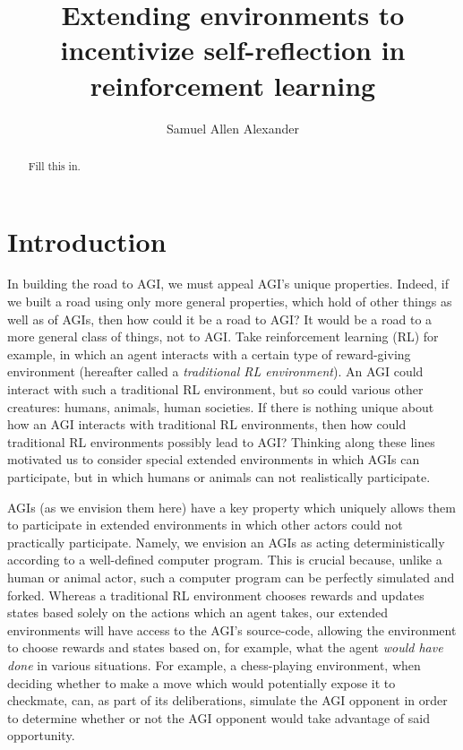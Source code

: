 \documentclass[runningheads]{llncs}
\begin{document}
\title{Extending environments to incentivize self-reflection in reinforcement learning}

\author{Samuel Allen Alexander}

\maketitle

\begin{abstract}
    Fill this in.
\end{abstract}

\section{Introduction}

In building the road to AGI, we must appeal AGI's unique properties.
Indeed, if we built a road using only more general properties, which hold of other things
as well as of AGIs, then how could it be a road to AGI? It would be a road to a
more general class of things, not to AGI. Take reinforcement learning (RL) for example, in
which an agent interacts with a certain type of reward-giving environment (hereafter called
a \emph{traditional RL environment}).
An AGI could interact with such
a traditional RL environment, but so could various other creatures: humans, animals,
human societies. If there is nothing unique about how an AGI interacts with
traditional RL environments,
then how could traditional RL environments possibly lead to AGI?
Thinking along these lines motivated us to consider
special extended environments in which AGIs can participate, but in which humans or animals
can not realistically participate.

AGIs (as we envision them here) have a key property which uniquely allows them to
participate in extended environments in which other actors could not practically
participate. Namely, we envision an AGIs as acting deterministically according to
a well-defined computer program. This is crucial because, unlike a human or animal
actor, such a computer program can be perfectly simulated and forked. Whereas a
traditional RL environment chooses rewards and updates states based solely on the
actions which an agent takes, our extended environments will have access to the AGI's
source-code, allowing the environment to choose rewards and states based on, for example,
what the agent \emph{would have done} in various situations. For example, a chess-playing
environment, when deciding whether to make a move which would potentially expose it to
checkmate, can, as part of its deliberations, simulate the AGI opponent in order to
determine whether or not the AGI opponent would take advantage of said opportunity.
\end{document}

